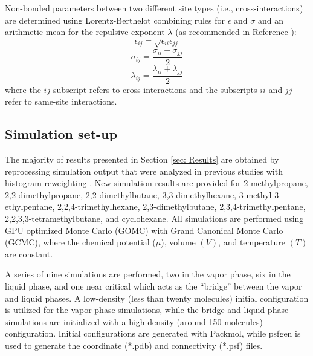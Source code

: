\documentclass[journal=jced,manuscript=article]{achemso}
\begin{document}
    Non-bonded parameters between two different site types (i.e., cross-interactions) are determined using Lorentz-Berthelot combining rules \cite{Allen1987} for $\epsilon$ and $\sigma$ and an arithmetic mean for the repulsive exponent $\lambda$ (as recommended in Reference ):
    \begin{equation} \label{eq:Lorentz-Berthelot_eps}
    \epsilon_{ij} = \sqrt{\epsilon_{ii} \epsilon_{jj}}
    \end{equation}
    \begin{equation} \label{eq:Lorentz-Berthelot_sig}
    \sigma_{ij} = \frac{\sigma_{ii} + \sigma_{jj}}{2}
    \end{equation}
    \begin{equation} \label{eq:Lorentz-Berthelot_lam}
    \lambda_{ij} = \frac{\lambda_{ii} + \lambda_{jj}}{2}
    \end{equation}
    where the $ij$ subscript refers to cross-interactions and the subscripts $ii$ and $jj$ refer to same-site interactions. 
    

\subsection{Simulation set-up} \label{sec: Simulation set-up}

The majority of results presented in Section \ref{sec: Results} are obtained by reprocessing simulation output that were analyzed in previous studies with histogram reweighting \cite{Potoff_branched,Barhaghi2017}. New simulation results are provided for 2-methylpropane, 2,2-dimethylpropane, 2,2-dimethylbutane, 3,3-dimethylhexane, 3-methyl-3-ethylpentane, 2,2,4-trimethylhexane, 2,3-dimethylbutane, 2,3,4-trimethylpentane, 2,2,3,3-tetramethylbutane, and cyclohexane. All simulations are performed using GPU optimized Monte Carlo (GOMC) \cite{GOMC} with Grand Canonical Monte Carlo (GCMC), where the chemical potential ($\mu$), volume $(V)$, and temperature $(T)$ are constant. 

A series of nine simulations are performed, two in the vapor phase, six in the liquid phase, and one near critical which acts as the ``bridge'' between the vapor and liquid phases. A low-density (less than twenty molecules) initial configuration is utilized for the vapor phase simulations, while the bridge and liquid phase simulations are initialized with a high-density (around 150 molecules) configuration. Initial configurations are generated with Packmol, while psfgen is used to generate the coordinate (*.pdb) and connectivity (*.psf) files.
\end{document}
